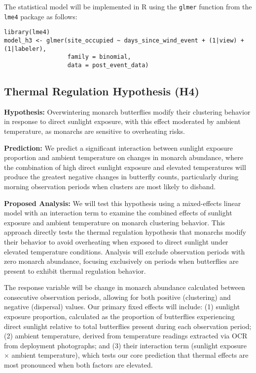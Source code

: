 The statistical model will be implemented in R using the \texttt{glmer} function from the \texttt{lme4} package as follows:

\begin{verbatim}
library(lme4)
model_h3 <- glmer(site_occupied ~ days_since_wind_event + (1|view) + (1|labeler),
                  family = binomial,
                  data = post_event_data)
\end{verbatim}

\subsection{Thermal Regulation Hypothesis (H4)}

\textbf{Hypothesis:} Overwintering monarch butterflies modify their clustering behavior in response to direct sunlight exposure, with this effect moderated by ambient temperature, as monarchs are sensitive to overheating risks.

\textbf{Prediction:} We predict a significant interaction between sunlight exposure proportion and ambient temperature on changes in monarch abundance, where the combination of high direct sunlight exposure and elevated temperatures will produce the greatest negative changes in butterfly counts, particularly during morning observation periods when clusters are most likely to disband.

\textbf{Proposed Analysis:}
We will test this hypothesis using a mixed-effects linear model with an interaction term to examine the combined effects of sunlight exposure and ambient temperature on monarch clustering behavior. This approach directly tests the thermal regulation hypothesis that monarchs modify their behavior to avoid overheating when exposed to direct sunlight under elevated temperature conditions. Analysis will exclude observation periods with zero monarch abundance, focusing exclusively on periods when butterflies are present to exhibit thermal regulation behavior.

The response variable will be change in monarch abundance calculated between consecutive observation periods, allowing for both positive (clustering) and negative (dispersal) values. Our primary fixed effects will include: (1) sunlight exposure proportion, calculated as the proportion of butterflies experiencing direct sunlight relative to total butterflies present during each observation period; (2) ambient temperature, derived from temperature readings extracted via OCR from deployment photographs; and (3) their interaction term (sunlight exposure $\times$ ambient temperature), which tests our core prediction that thermal effects are most pronounced when both factors are elevated.

